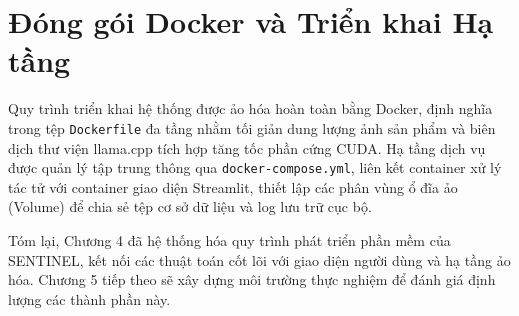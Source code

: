 \section{Đóng gói Docker và Triển khai Hạ tầng}
Quy trình triển khai hệ thống được ảo hóa hoàn toàn bằng Docker, định nghĩa trong tệp \texttt{Dockerfile} đa tầng nhằm tối giản dung lượng ảnh sản phẩm và biên dịch thư viện llama.cpp tích hợp tăng tốc phần cứng CUDA. Hạ tầng dịch vụ được quản lý tập trung thông qua \texttt{docker-compose.yml}, liên kết container xử lý tác tử với container giao diện Streamlit, thiết lập các phân vùng ổ đĩa ảo (Volume) để chia sẻ tệp cơ sở dữ liệu và log lưu trữ cục bộ.

Tóm lại, Chương 4 đã hệ thống hóa quy trình phát triển phần mềm của SENTINEL, kết nối các thuật toán cốt lõi với giao diện người dùng và hạ tầng ảo hóa. Chương 5 tiếp theo sẽ xây dựng môi trường thực nghiệm để đánh giá định lượng các thành phần này.
